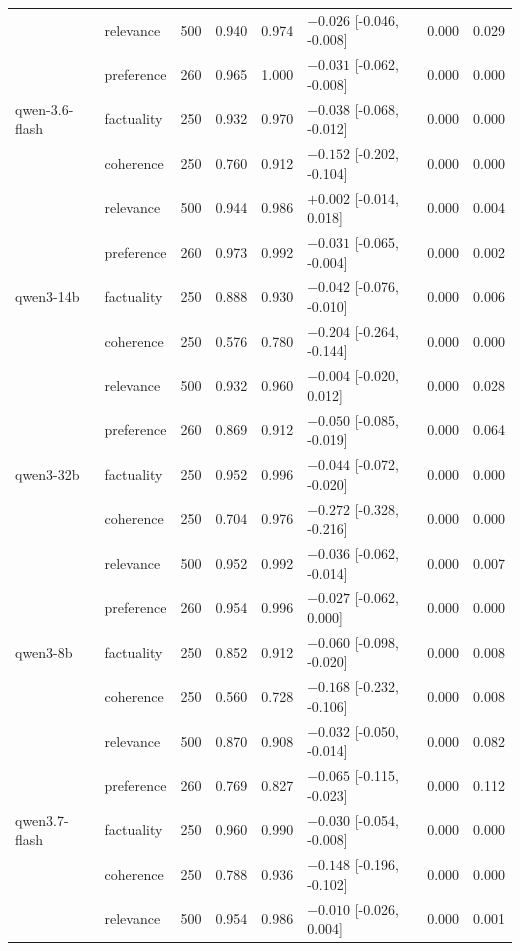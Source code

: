\begin{table}[t]
\begin{tabular}{llrrrlrr}
 & relevance & 500 & 0.940 & 0.974 & $-0.026$ [-0.046, -0.008] & 0.000 & 0.029 \\
 & preference & 260 & 0.965 & 1.000 & $-0.031$ [-0.062, -0.008] & 0.000 & 0.000 \\
\addlinespace
qwen-3.6-flash & factuality & 250 & 0.932 & 0.970 & $-0.038$ [-0.068, -0.012] & 0.000 & 0.000 \\
 & coherence & 250 & 0.760 & 0.912 & $-0.152$ [-0.202, -0.104] & 0.000 & 0.000 \\
 & relevance & 500 & 0.944 & 0.986 & $+0.002$ [-0.014, 0.018] & 0.000 & 0.004 \\
 & preference & 260 & 0.973 & 0.992 & $-0.031$ [-0.065, -0.004] & 0.000 & 0.002 \\
\addlinespace
qwen3-14b & factuality & 250 & 0.888 & 0.930 & $-0.042$ [-0.076, -0.010] & 0.000 & 0.006 \\
 & coherence & 250 & 0.576 & 0.780 & $-0.204$ [-0.264, -0.144] & 0.000 & 0.000 \\
 & relevance & 500 & 0.932 & 0.960 & $-0.004$ [-0.020, 0.012] & 0.000 & 0.028 \\
 & preference & 260 & 0.869 & 0.912 & $-0.050$ [-0.085, -0.019] & 0.000 & 0.064 \\
\addlinespace
qwen3-32b & factuality & 250 & 0.952 & 0.996 & $-0.044$ [-0.072, -0.020] & 0.000 & 0.000 \\
 & coherence & 250 & 0.704 & 0.976 & $-0.272$ [-0.328, -0.216] & 0.000 & 0.000 \\
 & relevance & 500 & 0.952 & 0.992 & $-0.036$ [-0.062, -0.014] & 0.000 & 0.007 \\
 & preference & 260 & 0.954 & 0.996 & $-0.027$ [-0.062, 0.000] & 0.000 & 0.000 \\
\addlinespace
qwen3-8b & factuality & 250 & 0.852 & 0.912 & $-0.060$ [-0.098, -0.020] & 0.000 & 0.008 \\
 & coherence & 250 & 0.560 & 0.728 & $-0.168$ [-0.232, -0.106] & 0.000 & 0.008 \\
 & relevance & 500 & 0.870 & 0.908 & $-0.032$ [-0.050, -0.014] & 0.000 & 0.082 \\
 & preference & 260 & 0.769 & 0.827 & $-0.065$ [-0.115, -0.023] & 0.000 & 0.112 \\
\addlinespace
qwen3.7-flash & factuality & 250 & 0.960 & 0.990 & $-0.030$ [-0.054, -0.008] & 0.000 & 0.000 \\
 & coherence & 250 & 0.788 & 0.936 & $-0.148$ [-0.196, -0.102] & 0.000 & 0.000 \\
 & relevance & 500 & 0.954 & 0.986 & $-0.010$ [-0.026, 0.004] & 0.000 & 0.001 \\

\end{tabular}
\end{table}
